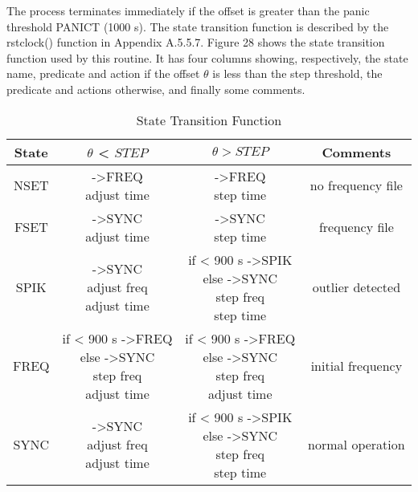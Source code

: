 The process terminates immediately if the offset is greater than the
panic threshold PANICT (1000 s).  The state transition function is
described by the rstclock() function in Appendix A.5.5.7.  Figure 28
shows the state transition function used by this routine.  It has
four columns showing, respectively, the state name, predicate and
action if the offset $ \theta $ is less than the step threshold, the
predicate and actions otherwise, and finally some comments.

\begin{table}[htb]
\center
\begin{tabular}{c | c | c | c}
State & $ \theta $ < $ STEP $        & $ \theta > STEP $      & Comments \\
\hline
\hline
NSET & \makecell{->FREQ \\ adjust time} & \makecell{->FREQ \\ step time} & no frequency file \\
FSET & \makecell{->SYNC \\ adjust time} & \makecell{->SYNC \\ step time} & frequency file \\
SPIK & \makecell{->SYNC \\ adjust freq \\ adjust time} & \makecell{if < 900 s ->SPIK \\ else ->SYNC \\ step freq \\ step time} & outlier detected \\
FREQ & \makecell{if < 900 s ->FREQ \\ else ->SYNC \\ step freq \\ adjust time} & \makecell{if < 900 s ->FREQ \\ else ->SYNC \\ step freq \\ adjust time} & initial frequency \\
SYNC & \makecell{->SYNC \\ adjust freq \\ adjust time} & \makecell{if < 900 s ->SPIK \\ else ->SYNC \\ step freq \\ step time} & normal operation \\
\hline
\end{tabular}
\label{state_transition_function}
\caption{State Transition Function}
\end{table}

